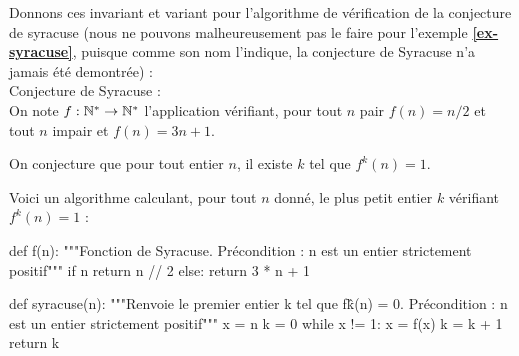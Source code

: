 Donnons ces invariant et variant pour l'algorithme de vérification de la conjecture de syracuse (nous ne 
pouvons malheureusement pas le faire pour l'exemple \textbf{\ref{ex-syracuse}}, puisque comme son 
nom l'indique, la conjecture de Syracuse n'a jamais été demontrée) :\\

Conjecture de Syracuse :\\
On note $f : \mathbb{N}^{*} \to \mathbb{N}^{*}$ l'application vérifiant, pour tout $n$ pair
$f(n)=n/2$ et tout $n$ impair et $f(n)=3n+1$.

On conjecture que pour tout entier $n$, il existe $k$ tel que
$f^{k}(n)=1$.

Voici un algorithme calculant, pour tout $n$ donné, le plus petit
entier $k$ vérifiant $f^{k}(n) = 1$ :

\begin{pyverbatim}
def f(n):
    """Fonction de Syracuse.
    Précondition : n est un entier strictement positif"""
    if n %
        return n // 2
    else:
        return 3 * n + 1
\end{pyverbatim}

\begin{pyverbatim}        
def syracuse(n):
    """Renvoie le premier entier k tel que  f\^k(n) = 0.
    Précondition : n est un entier strictement positif"""
    x = n
    k = 0
    while x != 1:
        x = f(x)
        k = k + 1
    return k
\end{pyverbatim}

